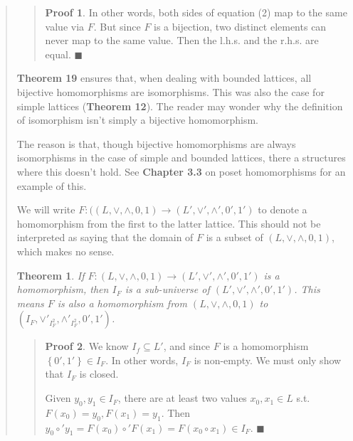 \documentclass[a4paper, 12pt]{article}
\newtheorem{theorem}{Theorem}
\theoremstyle{definition}
\theoremstyle{definition}
\theoremstyle{definition}
\newtheorem{pro}{Proof}
\begin{document}
\begin{quote}
\begin{quote}
\begin{pro}
    In other words, both sides of equation (2) map to the same value via $F$.
    But since $F$ is a bijection, two distinct elements can never map to the
    same value. Then the l.h.s. and the r.h.s. are equal. $\blacksquare$

\end{pro}

\end{quote}
\normalsize

\textbf{Theorem 19} ensures that, when dealing with bounded lattices, all
bijective homomorphisms are isomorphisms. This was also the case for simple
lattices (\textbf{Theorem 12}). The reader may wonder why the definition of
isomorphism isn't simply a bijective homomorphism. 

The reason is that, though bijective homomorphisms are always isomorphisms in
the case of simple and bounded lattices, there a structures where this doesn't
hold. See \textbf{Chapter 3.3} on poset homomorphisms for an example of this.

We will write $F : ((L, \lor, \land, 0, 1) \to (L', \lor', \land', 0', 1')$ to 
denote a homomorphism from the first to the latter lattice.
This should not be interpreted as saying that the domain of $F$
is a subset of $(L, \lor, \land, 0, 1)$, which makes no sense.

\begin{theorem}
    If $F : (L, \lor, \land, 0, 1) \to (L', \lor', \land', 0', 1')$ is a
    homomorphism, then $I_F$ is a sub-universe of $(L', \lor', \land', 0', 1')$.
    This means $F$ is also a homomorphism from $(L, \lor, \land, 0, 1)$
    to $(I_F, \lor'_{I_F^2}, \land'_{I_F^2}, 0', 1')$.
\end{theorem}


\small
\begin{quote}

\begin{pro}
    We know $I_f \subseteq L'$, and since $F$ is a homomorphism $\left\{ 0', 1'
    \right\} \in I_F $. In other words, $I_F$ is non-empty. We 
    must only show that $I_F$ is closed. 

    Given $y_0, y_1 \in I_F$, there are at least two values $x_0, x_1 \in L$
    s.t. $F(x_0) = y_0, F(x_1) = y_1$. Then $y_0 \circ' y_1 = F(x_0) \circ'
    F(x_1) = F(x_0 \circ x_1) \in I_F$. $\blacksquare$

\end{pro}

\end{quote}
\normalsize
\pagebreak
{}


\end{quote}
\end{document}
